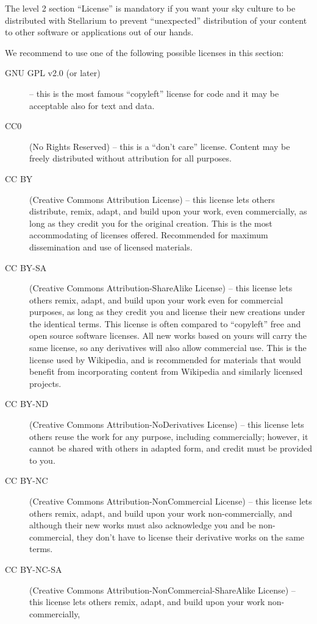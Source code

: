 The level 2 section ``License''  is mandatory if you want your sky culture to be distributed with
Stellarium to prevent ``unexpected'' distribution of your content to other
software or applications out of our hands.  

We recommend to use one of the following possible licenses in this section: 
\begin{description}
  \item[GNU GPL v2.0 (or later)] -- this is the most famous ``copyleft'' license for code and it may be acceptable also for text and data.
  \item[CC0] (No Rights Reserved) -- this is a ``don't care'' license. Content may be freely distributed without attribution for all purposes. 
  \item[CC BY] (Creative Commons Attribution License) -- this license lets others distribute, remix, adapt, and build upon your work, even commercially, 
    as long as they credit you for the original creation.
    This is the most accommodating of licenses offered. Recommended for maximum dissemination and use of licensed materials.
  \item[CC BY-SA] (Creative Commons Attribution-ShareAlike License) -- this license lets others remix, adapt, and build upon your work even for commercial purposes, 
    as long as they credit you and license their new creations under the identical terms.
    This license is often compared to ``copyleft'' free and open source software licenses. 
	All new works based on yours will carry the same license, so any derivatives will also allow commercial use.
    This is the license used by Wikipedia, and is recommended for materials that would benefit from incorporating content from Wikipedia and similarly licensed projects.
  \item[CC BY-ND] (Creative Commons Attribution-NoDerivatives License) -- this license lets others reuse the work for any purpose, including commercially; 
    however, it cannot be shared with others in adapted form, and credit must be provided to you.
  \item[CC BY-NC] (Creative Commons Attribution-NonCommercial License) -- this license lets others remix, adapt, and build upon your work non-commercially, 
    and although their new works must also acknowledge you and be non-commercial, they don’t have to license their derivative works on the same terms.
  \item[CC BY-NC-SA] (Creative Commons Attribution-NonCommercial-ShareAlike License) -- this license lets others remix, adapt, and build upon your work non-commercially, 

\end{description}
